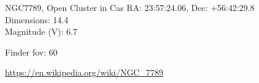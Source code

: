 \begin{block}{NGC7789, Open Cluster in Cas}
    RA: 23:57:24.06, Dec: +56:42:29.8 \\ 
    Dimensions: 14.4 \\ 
    Magnitude (V): 6.7



    Finder fov: 60 

    \url{https://en.wikipedia.org/wiki/NGC_7789} 
\end{block}